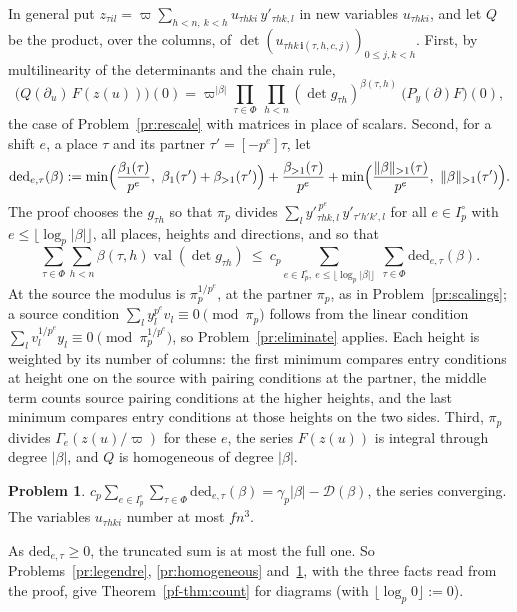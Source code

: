 \documentclass[reqno]{amsart}
\theoremstyle{plain}
\theoremstyle{definition}
\newtheorem{problem}{Problem}[section]
\theoremstyle{remark}
\newcommand{\val}{\operatorname{val}}
\newcommand{\Dc}{\mathcal{D}}
\newcommand{\bi}{\mathbf{i}}
\newcommand{\nb}[1]{\lVert #1 \rVert}
\begin{document}
In general put \(z_{\tau i l} = \varpi \sum_{h < n,\ k < h} u_{\tau h k i}\, y'_{\tau h k, l}\) in new variables \(u_{\tau h k i}\), and let \(Q\) be the product, over the columns, of \(\det(u_{\tau h k\, \bi(\tau, h, c, j)})_{0 \le j, k < h}\).  First, by multilinearity of the determinants and the chain rule,
\[
  \bigl(Q(\partial_u)\, F(z(u))\bigr)(0) = \varpi^{\lvert\beta\rvert} \prod_{\tau \in \Phi}\ \prod_{h < n} (\det g_{\tau h})^{\beta(\tau, h)}\ \bigl(P_y(\partial) F\bigr)(0) ,
\]
the case of Problem~\ref{pr:rescale} with matrices in place of scalars.  Second, for a shift \(e\), a place \(\tau\) and its partner \(\tau' = [-p^e]\tau\), let
\[
  \mathrm{ded}_{e, \tau}(\beta) := \min\Bigl(\frac{\beta_1(\tau)}{p^e},\ \beta_1(\tau') + \beta_{>1}(\tau')\Bigr) + \frac{\beta_{>1}(\tau)}{p^e} + \min\Bigl(\frac{\nb{\beta}_{>1}(\tau)}{p^e},\ \nb{\beta}_{>1}(\tau')\Bigr) .
\]
The proof chooses the \(g_{\tau h}\) so that \(\pi_p\) divides \(\sum_l y'^{\,p^e}_{\tau h k, l}\, y'_{\tau' h' k', l}\) for all \(e \in I_p^\circ\) with \(e \le \lfloor \log_p \lvert\beta\rvert \rfloor\), all places, heights and directions, and so that
\[
  \sum_{\tau \in \Phi} \sum_{h < n} \beta(\tau, h) \val(\det g_{\tau h}) \ \le\ c_p \sum_{e \in I_p^\circ,\ e \le \lfloor \log_p \lvert\beta\rvert \rfloor}\ \sum_{\tau \in \Phi} \mathrm{ded}_{e, \tau}(\beta) .
\]
At the source the modulus is \(\pi_p^{1/p^e}\), at the partner \(\pi_p\), as in Problem~\ref{pr:scalings}; a source condition \(\sum_l y_l^{p^e} v_l \equiv 0 \pmod{\pi_p}\) follows from the linear condition \(\sum_l v_l^{1/p^e} y_l \equiv 0 \pmod{\pi_p^{1/p^e}}\), so Problem~\ref{pr:eliminate} applies.  Each height is weighted by its number of columns: the first minimum compares entry conditions at height one on the source with pairing conditions at the partner, the middle term counts source pairing conditions at the higher heights, and the last minimum compares entry conditions at those heights on the two sides.  Third, \(\pi_p\) divides \(\Gamma_e(z(u)/\varpi)\) for these \(e\), the series \(F(z(u))\) is integral through degree \(\lvert\beta\rvert\), and \(Q\) is homogeneous of degree \(\lvert\beta\rvert\).

\begin{problem}\label{pr:deduction}
\(c_p \sum_{e \in I_p^\circ} \sum_{\tau \in \Phi} \mathrm{ded}_{e, \tau}(\beta) = \gamma_p \lvert\beta\rvert - \Dc(\beta)\), the series converging.  The variables \(u_{\tau h k i}\) number at most \(f n^3\).
\end{problem}

As \(\mathrm{ded}_{e,\tau} \ge 0\), the truncated sum is at most the full one.  So Problems~\ref{pr:legendre}, \ref{pr:homogeneous} and~\ref{pr:deduction}, with the three facts read from the proof, give Theorem~\ref{pf-thm:count} for diagrams (with \(\lfloor\log_p 0\rfloor := 0\)).
\end{document}
